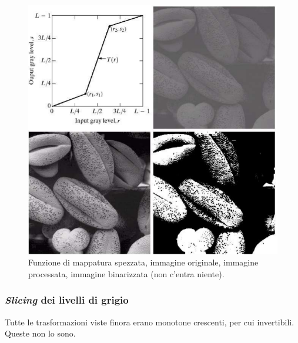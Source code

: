 \documentclass[a4paper,11pt]{article}
\begin{document}
\renewcommand{\thefigure}{5.12}
\begin{figure}[!h]
  \centering
    \includegraphics[scale=0.5]{images/5/piecewise.png}
    \caption{Funzione di mappatura spezzata, immagine originale, immagine processata, immagine binarizzata (non c'entra niente).}
\end{figure}

\newpage
\subsubsection{\textit{Slicing} dei livelli di grigio}
Tutte le trasformazioni viste finora erano monotone crescenti, per cui invertibili. Queste non lo sono.
\end{document}
